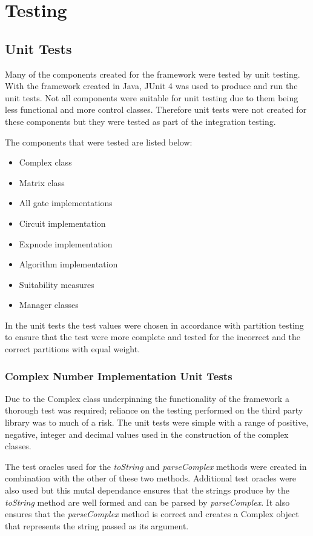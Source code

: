 \chapter{Testing}
\label{sec:testing}
\section{Unit Tests}
\label{sec:unittests}
Many of the components created for the framework were tested by unit testing.
With the framework created in Java, JUnit 4\cite{junitweb} was used to produce and run the unit tests.
Not all components were suitable for unit testing due to them being less functional and more control classes.
Therefore unit tests were not created for these components but they were tested as part of the integration testing.

The components that were tested are listed below:
\begin{itemize}
 \item Complex class
 \item Matrix class
 \item All gate implementations
 \item Circuit implementation
 \item Expnode implementation
 \item Algorithm implementation
 \item Suitability measures
 \item Manager classes
\end{itemize}

In the unit tests the test values were chosen in accordance with partition testing to ensure that the test were more complete and tested for the incorrect and the correct partitions with equal weight.

\subsection{Complex Number Implementation Unit Tests}
Due to the Complex class underpinning the functionality of the framework a thorough test was required; reliance on the testing performed on the third party library was to much of a risk.
The unit tests were simple with a range of positive, negative, integer and decimal values used in the construction of the complex classes.

The test oracles used for the \emph{toString} and \emph{parseComplex} methods were created in combination with the other of these two methods.
Additional test oracles were also used but this mutal dependance ensures that the strings produce by the \emph{toString} method are well formed and can be parsed by \emph{parseComplex}.
It also ensures that the \emph{parseComplex} method is correct and creates a Complex object that represents the string passed as its argument.

